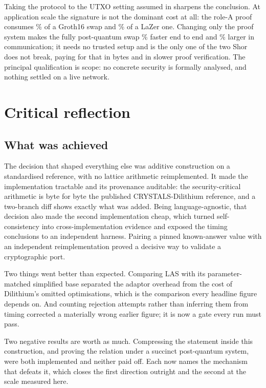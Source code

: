 Taking the protocol to the UTXO setting assumed in \cite{esgin2020post} sharpens the
conclusion. At application scale the signature is not the dominant cost at all: the role-A
proof consumes \cfgTwoProofPct\% of a Groth16 swap and \cfgThreeProofPct\% of a LaZer one.
Changing only the proof system makes the fully post-quantum swap \cmpTimePctAbs\% faster
end to end and \cmpBytesPctAbs\% larger in communication; it needs no trusted setup and is
the only one of the two Shor does not break, paying for that in bytes and in slower proof
verification. The principal qualification is scope: no concrete security is formally
analysed, and nothing settled on a live network.

\section{Critical reflection}
\label{sec:reflection}

\subsection{What was achieved}
\label{sec:reflection-achieved}

The decision that shaped everything else was additive construction on a standardised reference, with no lattice arithmetic reimplemented. It made the implementation tractable
and its provenance auditable: the security-critical arithmetic is byte for byte the
published CRYSTALS-Dilithium reference, and a two-branch diff shows exactly what was added.
Being language-agnostic, that decision also made the second implementation cheap, which
turned self-consistency into cross-implementation evidence and exposed the timing
conclusions to an independent harness. Pairing a pinned known-answer value with an
independent reimplementation proved a decisive way to validate a cryptographic port.

Two things went better than expected. Comparing LAS with its parameter-matched simplified
base separated the adaptor overhead from the cost of Dilithium's omitted optimisations,
which is the comparison every headline figure depends on. And counting rejection attempts
rather than inferring them from timing corrected a materially wrong earlier figure; it is
now a gate every run must pass.

Two negative results are worth as much. Compressing the statement inside this construction,
and proving the relation under a succinct post-quantum system, were both implemented and
neither paid off. Each now names the mechanism that defeats it, which closes the first
direction outright and the second at the scale measured here.

